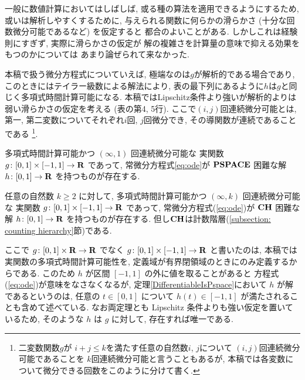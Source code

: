 一般に数値計算においてはしばしば, 
或る種の算法を適用できるようにするため, 
或いは解析しやすくするために, 
与えられる関数に何らかの滑らかさ (十分な回数微分可能であるなど) を仮定すると
都合のよいことがある. 
しかしこれは経験則にすぎず, 
実際に滑らかさの仮定が
解の複雑さを計算量の意味で抑える効果をもつのかについては
あまり論ぜられて来なかった. 

本稿で扱う微分方程式についていえば, 
極端なのは$g$が解析的である場合であり, 
このときにはテイラー級数による解法により, 
表の最下列にあるように$h$は$g$と同じく多項式時間計算可能になる. 
本稿ではLipschitz条件より強いが解析的よりは弱い滑らかさの仮定を考える
(表の第4, 5行). 
ここで$(i, j)$回連続微分可能とは, 
第一, 第二変数についてそれぞれ$i$回, $j$回微分でき, 
その導関数が連続であることである
\footnote{%
二変数関数$g$が
$i+j \le k$を満たす任意の自然数$i$, $j$について
$(i,j)$回連続微分可能であることを
$k$回連続微分可能と言うこともあるが, 
本稿では各変数について微分できる回数をこのように分けて書く.}.

 \begin{theorem}
  \label{DifferentiableIsPspace}
  多項式時間計算可能かつ $(\infty, 1)$ 回連続微分可能な
  実関数 $g \colon [0,1] \times [-1,1] \to \mathbf R$ であって, 
  常微分方程式\eqref{eq:ode}が
  $\mathbf{PSPACE}$ 困難な解 $h \colon [0, 1] \to \mathbf R$ を持つものが存在する.
 \end{theorem}

 \begin{theorem}
  \label{KTimesIsCH}
  任意の自然数 $k \ge 2$ に対して, 
  多項式時間計算可能かつ $(\infty, k)$ 回連続微分可能な
  実関数 $g \colon [0,1] \times [-1,1] \to \mathbf R$ であって, 
  常微分方程式(\ref{eq:ode})が
  $\mathbf{CH}$ 困難な解 $h \colon [0, 1] \to \mathbf R$ を持つものが存在する.
但し$\mathbf{CH}$は計数階層(\ref{subsection: counting hierarchy}節)である.
 \end{theorem}

ここで $g \colon [0,1] \times \mathbf R \to \mathbf R$ でなく
$g \colon [0,1] \times [-1, 1] \to \mathbf R$ と書いたのは, 
本稿では実関数の多項式時間計算可能性を, 
定義域が有界閉領域のときにのみ定義するからである. 
このため $h$ が区間 $[-1, 1]$ の外に値を取ることがあると
方程式(\ref{eq:ode})が意味をなさなくなるが, 
定理\ref{DifferentiableIsPspace}において $h$ が解であるというのは, 
任意の $t \in [0, 1]$ について $h (t) \in [-1, 1]$ が満たされることも含めて述べている.
なお両定理とも Lipschitz 条件よりも強い仮定を置いているため, 
そのような $h$ は $g$ に対して, 存在すれば唯一である. 

